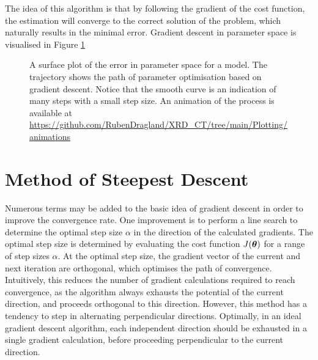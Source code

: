 The idea of this algorithm is that by following the gradient of the cost function,
the estimation will converge to the correct solution of the problem,
which naturally results in the minimal error.
Gradient descent in parameter space is visualised in Figure \ref{fig:GD_surface}

\begin{figure}[h!]
    \centering
    
    \caption{A surface plot of the error in parameter space for a model. The trajectory shows the path of parameter optimisation based on gradient descent.
        Notice that the smooth curve is an indication of many steps with a small step size. An animation of the process is available at \url{https://github.com/RubenDragland/XRD_CT/tree/main/Plotting/animations} %
    }
    \label{fig:GD_surface}
\end{figure}


\section{Method of Steepest Descent}\label{sec:theory_MSD}
Numerous terms may be added to the basic idea of gradient descent in order to improve the convergence rate.
One improvement is to perform a line search to determine the optimal step size $\alpha$ in the direction of the calculated gradients.
The optimal step size is determined by evaluating the cost function $J(\mathrm{\boldsymbol{\theta}})$ for a range of step sizes $\alpha$.
At the optimal step size, the gradient vector of the current and next iteration are orthogonal, which optimises the path of convergence.  %
Intuitively, this reduces the number of gradient calculations required to reach convergence, as the algorithm always exhausts the potential of the current direction, and proceeds orthogonal to this direction.
However, this method has a tendency to step in alternating perpendicular directions. Optimally, in an ideal gradient descent algorithm,
each independent direction should be exhausted in a single gradient calculation, before proceeding perpendicular to the current direction.


